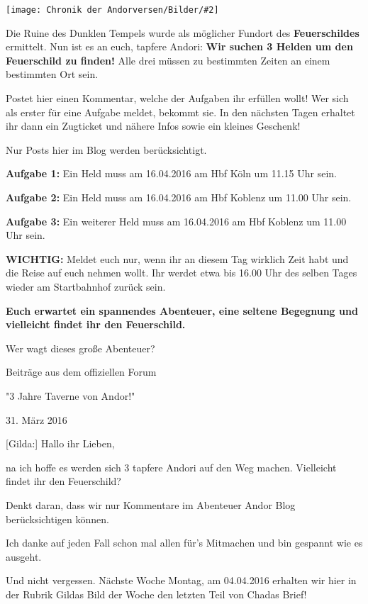 \documentclass[10pt, a4paper, oneside]{book}
\newcommand{\bildmitts}[2][height=0.32\textwidth,width=0.48\textwidth,keepaspectratio]{%
    \begin{center}
        \texttt{[image: Chronik der Andorversen/Bilder/\#2]}
    \end{center}
}
\begin{document}
\begin{multicols}{2}
\bildmitts{AA2016 Blog 6.jpeg}



Die Ruine des Dunklen Tempels wurde als möglicher Fundort des \textbf{Feuerschildes} ermittelt. Nun ist es an euch, tapfere Andori: \textbf{Wir suchen 3 Helden um den Feuerschild zu finden!} Alle drei müssen zu bestimmten Zeiten an einem bestimmten Ort sein.

Postet hier einen Kommentar, welche der Aufgaben ihr erfüllen wollt! Wer sich als erster für eine Aufgabe meldet, bekommt sie. In den nächsten Tagen erhaltet ihr dann ein Zugticket und nähere Infos sowie ein kleines Geschenk!

Nur Posts hier im Blog werden berücksichtigt.

\textbf{Aufgabe 1:} Ein Held muss am 16.04.2016 am Hbf Köln um 11.15 Uhr sein.

\textbf{Aufgabe 2:} Ein Held muss am 16.04.2016 am Hbf Koblenz um 11.00 Uhr sein.

\textbf{Aufgabe 3:} Ein weiterer Held muss am 16.04.2016 am Hbf Koblenz um 11.00 Uhr sein.

\textbf{WICHTIG:} Meldet euch nur, wenn ihr an diesem Tag wirklich Zeit habt und die Reise auf euch nehmen wollt. Ihr werdet etwa bis 16.00 Uhr des selben Tages wieder am Startbahnhof zurück sein.

\textbf{Euch erwartet ein spannendes Abenteuer, eine seltene Begegnung und vielleicht findet ihr den Feuerschild.}

Wer wagt dieses große Abenteuer?




\begin{center}
    Beiträge aus dem offiziellen Forum

    "3 Jahre Taverne von Andor!"

    31. März 2016
\end{center}




[Gilda:] Hallo ihr Lieben,

na ich hoffe es werden sich 3 tapfere Andori auf den Weg machen. Vielleicht findet ihr den Feuerschild?

Denkt daran, dass wir nur Kommentare im Abenteuer Andor Blog berücksichtigen können.

Ich danke auf jeden Fall schon mal allen für's Mitmachen und bin gespannt wie es ausgeht.

Und nicht vergessen. Nächste Woche Montag, am 04.04.2016 erhalten wir hier in der Rubrik Gildas Bild der Woche den letzten Teil von Chadas Brief!


\end{multicols}
\end{document}
